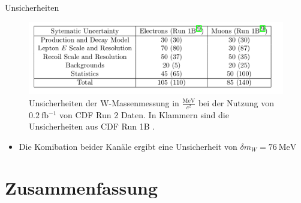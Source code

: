 \documentclass[aspectratio=1610, 9pt]{beamer}
\begin{document}
\begin{frame}{Unsicherheiten}
  \begin{figure}
    \includegraphics[width=\textwidth]{images/unsicherheiten.png}
    \caption{Unsicherheiten der W-Massenmessung in $\frac{\si{\MeV}}{c^2}$ bei der Nutzung von $\SI{0,2}{\femto \barn^{-1}}$ von CDF Run 2 Daten. In Klammern sind die Unsicherheiten aus CDF Run 1B \cite{unsicherheiten}.}
  \end{figure}
  \begin{itemize}
    \item Die Komibation beider Kanäle ergibt eine Unsicherheit von $\delta m_W = \SI{76}{\MeV}$
  \end{itemize}
\end{frame}

\section{Zusammenfassung}
\end{document}
